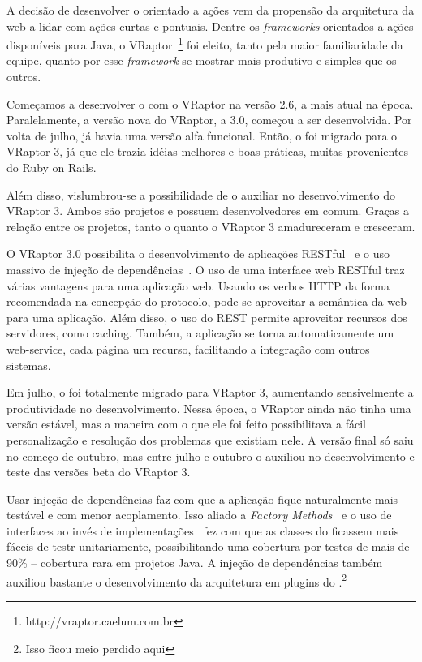 A decisão de desenvolver o \calopsita{} orientado a ações vem da propensão da arquitetura da web a lidar com ações curtas e pontuais. Dentre os \textit{frameworks} orientados a ações disponíveis para Java, o VRaptor~\footnote{http://vraptor.caelum.com.br} foi eleito, tanto pela maior familiaridade da equipe, quanto por esse \textit{framework} se mostrar mais produtivo e simples que os outros.

Começamos a desenvolver o \calopsita{} com o VRaptor na versão 2.6, a mais atual na época. Paralelamente, a versão nova do VRaptor, a 3.0, começou a ser desenvolvida. Por volta de julho, já havia uma versão alfa funcional. Então, o \calopsita{} foi migrado para o VRaptor 3, já que ele trazia idéias melhores e boas práticas, muitas provenientes do Ruby on Rails. 

Além disso, vislumbrou-se a possibilidade de o \calopsita{} auxiliar no desenvolvimento do VRaptor 3. Ambos são projetos \opensource{} e possuem desenvolvedores em comum. Graças a relação entre os projetos, tanto o \calopsita{} quanto o VRaptor 3 amadureceram e cresceram.

O VRaptor 3.0 possibilita o desenvolvimento de aplicações RESTful~\cite{rest} e o uso massivo de injeção de dependências~\cite{di}. O uso de uma interface web RESTful traz várias vantagens para uma aplicação web. Usando os verbos HTTP da forma recomendada na concepção do protocolo, pode-se aproveitar a semântica da web para uma aplicação. Além disso, o uso do REST permite aproveitar recursos dos servidores, como caching. Também, a aplicação se torna automaticamente um web-service, cada página um recurso, facilitando a integração com outros sistemas.

Em julho, o \calopsita{} foi totalmente migrado para VRaptor 3, aumentando sensivelmente a produtividade no desenvolvimento. Nessa época, o VRaptor ainda não tinha uma versão estável, mas a maneira com o que ele foi feito possibilitava a fácil personalização e resolução dos problemas que existiam nele. A versão final só saiu no começo de outubro, mas entre julho e outubro o \calopsita{} auxiliou no desenvolvimento e teste das versões beta do VRaptor 3.

Usar injeção de dependências faz com que a aplicação fique naturalmente mais testável e com menor acoplamento. Isso aliado a \textit{Factory Methods}~\cite{gof} e o uso de interfaces ao invés de implementações~\cite{effective} fez com que as classes do \calopsita ficassem mais fáceis de testr unitariamente, possibilitando uma cobertura por testes de mais de 90\% -- cobertura rara em projetos Java. A injeção de dependências também auxiliou bastante o desenvolvimento da arquitetura em plugins do \calopsita{}.\footnote{Isso ficou meio perdido aqui}

